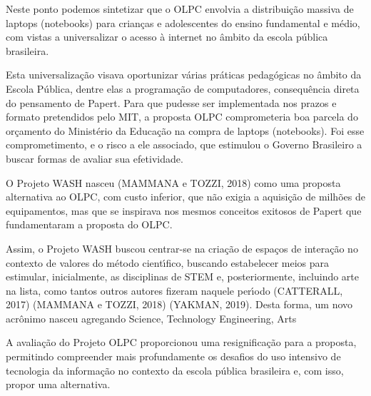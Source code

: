\documentclass[
12pt,		%
openright,	%
twoside,  %
a4paper,			%
chapter=TITLE,		%
english,			%
french,				%
spanish,			%
brazil				%
]{USPSC-classe/USPSC}
\begin{document}
Neste ponto podemos sintetizar que o OLPC envolvia a distribui\c{c}\~ao massiva de laptops (notebooks) para crian\c{c}as e adolescentes do  ensino fundamental e m\'edio, com vistas a universalizar o acesso \`a internet no \^ambito da escola p\'ublica brasileira.










Esta universaliza\c{c}\~ao visava oportunizar v\'arias pr\'aticas pedag\'ogicas no \^ambito da Escola P\'ublica, dentre elas a programa\c{c}\~ao de computadores, consequ\^encia direta do pensamento de Papert. Para que pudesse ser implementada nos prazos e formato pretendidos pelo MIT, a proposta OLPC comprometeria boa parcela do or\c{c}amento do Minist\'erio da Educa\c{c}\~ao na compra de laptops (notebooks). Foi esse comprometimento, e o risco a ele associado, que estimulou o Governo Brasileiro a buscar formas de avaliar sua efetividade.










O Projeto WASH nasceu  (MAMMANA e TOZZI, 2018)  como uma proposta alternativa ao OLPC, com custo inferior, que n\~ao exigia a aquisi\c{c}\~ao de milh\~oes de equipamentos, mas que se inspirava nos mesmos conceitos exitosos de Papert que fundamentaram a proposta do OLPC.










Assim, o Projeto WASH buscou centrar-se na cria\c{c}\~ao de espa\c{c}os de intera\c{c}\~ao no contexto de valores do m\'etodo cient\'{\i}fico, buscando estabelecer meios para estimular, inicialmente, as disciplinas de STEM e, posteriormente, incluindo arte na lista, como tantos outros autores fizeram naquele per\'{\i}odo  (CATTERALL, 2017) (MAMMANA e TOZZI, 2018)  (YAKMAN, 2019). Desta forma, um novo acr\^onimo nasceu agregando Science, Technology Engineering, Arts 










A avalia\c{c}\~ao do Projeto OLPC proporcionou uma resignifica\c{c}\~ao para a proposta, permitindo compreender mais profundamente os desafios do uso intensivo de tecnologia da informa\c{c}\~ao no contexto da escola p\'ublica brasileira e, com isso, propor uma alternativa.
\end{document}
